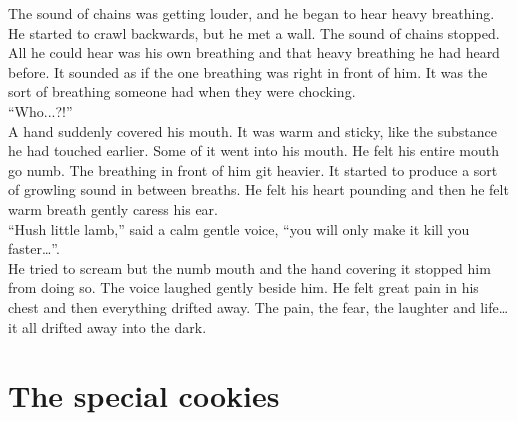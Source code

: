 \documentclass[a4paper,onecolumn,11pt]{article}
\begin{document}
\newline
The sound of chains was getting louder, and he began to hear heavy breathing. He started to crawl backwards, but he met a wall. The sound of chains stopped. All he could hear was his own breathing and that heavy breathing he had heard before. It sounded as if the one breathing was right in front of him. It was the sort of breathing someone had when they were chocking.\\
\newline
``Who...?!''\\
\newline
A hand suddenly covered his mouth. It was warm and sticky, like the substance he had touched earlier. Some of it went into his mouth. He felt his entire mouth go numb. The breathing in front of him git heavier. It started to produce a sort of growling sound in between breaths. He felt his heart pounding and then he felt warm breath gently caress his ear.\\
\newline
``Hush little lamb,'' said a calm gentle voice, ``you will only make it kill you faster\ldots''.\\
\newline
He tried to scream but the numb mouth and the hand covering it stopped him from doing so. The voice laughed gently beside him. He felt great pain in his chest and then everything drifted away. The pain, the fear, the laughter and life\ldots it all drifted away into the dark.

\newpage


\section{The special cookies}
\end{document}
